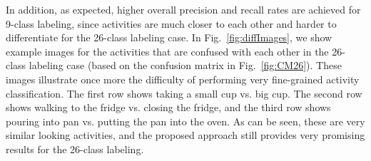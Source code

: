 \documentclass[10pt,twocolumn,letterpaper]{article}
\begin{document}
In addition, as expected, higher overall precision and recall rates are achieved for 9-class labeling, since activities are much closer to each other and harder to differentiate for the 26-class labeling case. In Fig.~\ref{fig:diffImages}, we show example images for the activities that are confused with each other in the 26-class labeling case (based on the confusion matrix in Fig.~\ref{fig:CM26}). These images illustrate once more the difficulty of performing very fine-grained activity classification. The first row shows taking a small cup vs. big cup. The second row shows walking to the fridge vs. closing the fridge, and the third row shows pouring into pan vs. putting the pan into the oven. As can be seen, these are very similar looking activities, and the proposed approach still provides very promising results for the 26-class labeling.
\end{document}
